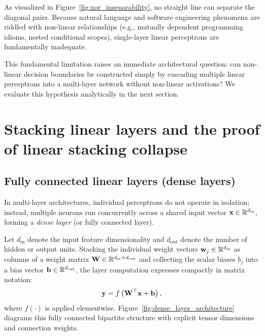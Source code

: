 \documentclass[../../main.tex]{subfiles}
\begin{document}
As visualized in Figure~\ref{fig:xor_inseparability}, no straight line can separate the diagonal pairs. Because natural language and software engineering phenomena are riddled with non-linear relationships (e.g., mutually dependent programming idioms, nested conditional scopes), single-layer linear perceptrons are fundamentally inadequate.

This fundamental limitation raises an immediate architectural question: can non-linear decision boundaries be constructed simply by cascading multiple linear perceptrons into a multi-layer network without non-linear activations? We evaluate this hypothesis analytically in the next section.


\clearpage
\section{Stacking linear layers and the proof of linear stacking collapse}
\label{sec:linear_stacking_collapse}

\subsection{Fully connected linear layers (dense layers)}
In multi-layer architectures, individual perceptrons do not operate in isolation; instead, multiple neurons run concurrently across a shared input vector $\mathbf{x} \in \mathbb{R}^{d_{\text{in}}}$, forming a \emph{dense layer} (or fully connected layer).

Let $d_{\text{in}}$ denote the input feature dimensionality and $d_{\text{out}}$ denote the number of hidden or output units. Stacking the individual weight vectors $\mathbf{w}_j \in \mathbb{R}^{d_{\text{in}}}$ as columns of a weight matrix $\mathbf{W} \in \mathbb{R}^{d_{\text{in}} \times d_{\text{out}}}$ and collecting the scalar biases $b_j$ into a bias vector $\mathbf{b} \in \mathbb{R}^{d_{\text{out}}}$, the layer computation expresses compactly in matrix notation:
\begin{equation}
\label{eq:dense_matrix_layer}
\mathbf{y} = f\left( \mathbf{W}^\top \mathbf{x} + \mathbf{b} \right),
\end{equation}
where $f(\cdot)$ is applied elementwise. Figure~\ref{fig:dense_layer_architecture} diagrams this fully connected bipartite structure with explicit tensor dimensions and connection weights.
\end{document}
